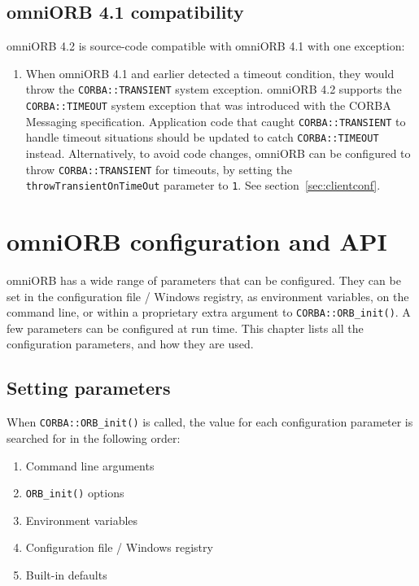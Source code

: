 \documentclass[11pt,oneside,a4paper]{book}
\newcommand{\code}[1]{\texttt{#1}}
\newcommand{\op}[1]{\texttt{#1()}}
\newcommand{\dsc}{\discretionary{}{}{}}
\begin{document}
\section{omniORB 4.1 compatibility}

omniORB 4.2 is source-code compatible with omniORB 4.1 with one
exception:

\begin{enumerate}

\item When omniORB 4.1 and earlier detected a timeout condition, they
  would throw the \code{CORBA::TRANSIENT} system exception. omniORB
  4.2 supports the \code{CORBA::TIMEOUT} system exception that was
  introduced with the CORBA Messaging specification. Application code
  that caught \code{CORBA::TRANSIENT} to handle timeout situations
  should be updated to catch \code{CORBA::TIMEOUT}
  instead. Alternatively, to avoid code changes, omniORB can be
  configured to throw \code{CORBA::TRANSIENT} for timeouts, by setting
  the \code{throwTransient\dsc{}OnTimeOut} parameter to \code{1}. See
  section~\ref{sec:clientconf}.

\end{enumerate}


\chapter{omniORB configuration and API}
\label{chap:config}

omniORB has a wide range of parameters that can be configured. They
can be set in the configuration file / Windows registry, as
environment variables, on the command line, or within a proprietary
extra argument to \op{CORBA::ORB\_init}. A few parameters can be
configured at run time. This chapter lists all the configuration
parameters, and how they are used.

\section{Setting parameters}

When \op{CORBA::ORB\_init} is called, the value for each configuration
parameter is searched for in the following order:

\begin{enumerate}

\item Command line arguments
\item \op{ORB\_init} options
\item Environment variables
\item Configuration file / Windows registry
\item Built-in defaults

\end{enumerate}
\end{document}
